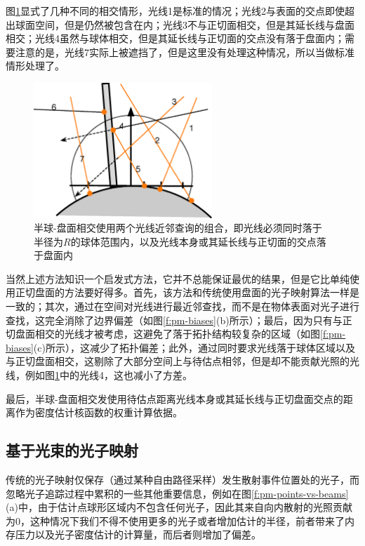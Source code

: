 图\ref{f:pm-hemisphere-disc}显式了几种不同的相交情形，光线1是标准的情况；光线2与表面的交点即使超出球面空间，但是仍然被包含在内；光线3不与正切面相交，但是其延长线与盘面相交；光线4虽然与球体相交，但是其延长线与正切面的交点没有落于盘面内；需要注意的是，光线7实际上被遮挡了，但是这里没有处理这种情况，所以当做标准情形处理了。

\begin{figure}
	\sidecaption
	\includegraphics[width=0.6\textwidth]{figures/pm/hemisphere-disc}
	\caption{半球-盘面相交使用两个光线近邻查询的组合，即光线必须同时落于半径为$R$的球体范围内，以及光线本身或其延长线与正切面的交点落于盘面内}
	\label{f:pm-hemisphere-disc}
\end{figure}

当然上述方法知识一个启发式方法，它并不总能保证最优的结果，但是它比单纯使用正切盘面的方法\cite{a:AParticlePathbasedMethodforMonteCarloDensityEstimation}要好得多。首先，该方法和传统使用盘面的光子映射算法一样是一致的；其次，通过在空间对光线进行最近邻查找，而不是在物体表面对光子进行查找，这完全消除了边界偏差（如图\ref{f:pm-biases}(b)所示）；最后，因为只有与正切盘面相交的光线才被考虑，这避免了落于拓扑结构较复杂的区域（如图\ref{f:pm-biases}(c)所示），这减少了拓扑偏差；此外，通过同时要求光线落于球体区域以及与正切盘面相交，这剔除了大部分空间上与待估点相邻，但是却不能贡献光照的光线，例如图\ref{f:pm-hemisphere-disc}中的光线4，这也减小了方差。

最后，半球-盘面相交发使用待估点距离光线本身或其延长线与正切盘面交点的距离作为密度估计核函数的权重计算依据。






\subsection{基于光束的光子映射}
传统的光子映射仅保存（通过某种自由路径采样）发生散射事件位置处的光子，而忽略光子追踪过程中累积的一些其他重要信息，例如在图\ref{f:pm-points-vs-beams}(a)中，由于估计点球形区域内不包含任何光子，因此其来自向内散射的光照贡献为0，这种情况下我们不得不使用更多的光子或者增加估计的半径，前者带来了内存压力以及光子密度估计的计算量，而后者则增加了偏差。

